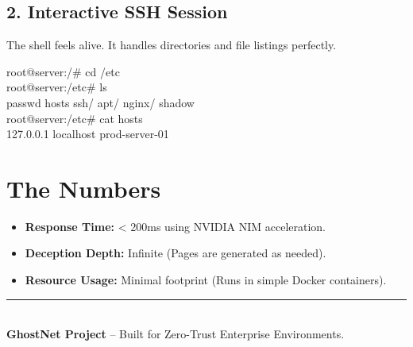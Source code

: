 \documentclass[11pt,a4paper,oneside]{article}
\begin{document}
\subsection{2. Interactive SSH Session}
The shell feels alive. It handles directories and file listings perfectly.

\begin{terminalbox}
root@server:/# cd /etc \\
root@server:/etc# ls \\
passwd  hosts  ssh/  apt/  nginx/  shadow \\
root@server:/etc# cat hosts \\
127.0.0.1   localhost  prod-server-01
\end{terminalbox}

\vspace{0.5cm}

\section{The Numbers}
\begin{itemize}
    \item \textbf{Response Time:} < 200ms using NVIDIA NIM acceleration.
    \item \textbf{Deception Depth:} Infinite (Pages are generated as needed).
    \item \textbf{Resource Usage:} Minimal footprint (Runs in simple Docker containers).
\end{itemize}

\vspace{1cm}
\begin{center}
    \textcolor{gray!60}{\rule{0.4\textwidth}{0.4pt}} \\
    \small \textbf{GhostNet Project} -- Built for Zero-Trust Enterprise Environments.
\end{center}
\end{document}
